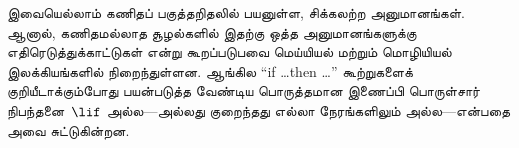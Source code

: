 \documentclass[../../../include/open-logic-section]{subfiles}
\begin{document}
இவையெல்லாம் கணிதப் பகுத்தறிதலில் பயனுள்ள, சிக்கலற்ற அனுமானங்கள்.
ஆனால், கணிதமல்லாத சூழல்களில் இதற்கு ஒத்த அனுமானங்களுக்கு எதிரெடுத்துக்காட்டுகள்
என்று கூறப்படுபவை மெய்யியல் மற்றும் மொழியியல் இலக்கியங்களில் நிறைந்துள்ளன.
ஆங்கில ``if \dots then \dots'' கூற்றுகளைக் குறியீடாக்கும்போது பயன்படுத்த
வேண்டிய பொருத்தமான இணைப்பி பொருள்சார் நிபந்தனை~$\lif$ அல்ல---அல்லது
குறைந்தது எல்லா நேரங்களிலும் அல்ல---என்பதை அவை சுட்டுகின்றன.
\end{document}
